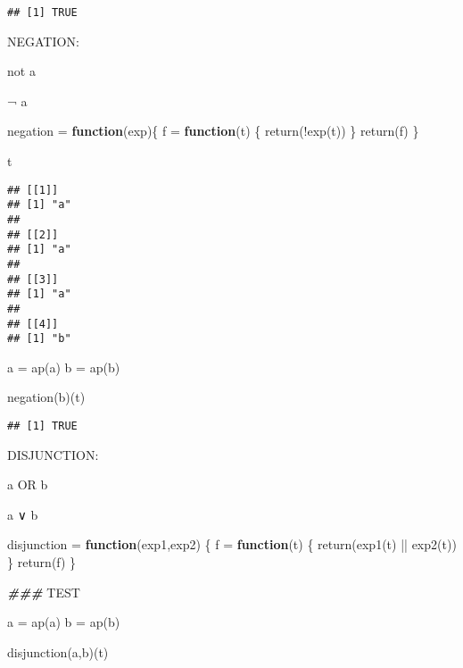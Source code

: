 \documentclass[
]{article}
\newenvironment{Shaded}{\begin{snugshade}}{\end{snugshade}}
\newcommand{\AlertTok}[1]{\textcolor[rgb]{0.94,0.16,0.16}{#1}}
\newcommand{\ControlFlowTok}[1]{\textcolor[rgb]{0.13,0.29,0.53}{\textbf{#1}}}
\newcommand{\DocumentationTok}[1]{\textcolor[rgb]{0.56,0.35,0.01}{\textbf{\textit{#1}}}}
\newcommand{\FunctionTok}[1]{\textcolor[rgb]{0.00,0.00,0.00}{#1}}
\newcommand{\NormalTok}[1]{#1}
\newcommand{\OtherTok}[1]{\textcolor[rgb]{0.56,0.35,0.01}{#1}}
\newcommand{\SpecialCharTok}[1]{\textcolor[rgb]{0.00,0.00,0.00}{#1}}
\newcommand{\StringTok}[1]{\textcolor[rgb]{0.31,0.60,0.02}{#1}}
\begin{document}
\begin{verbatim}
## [1] TRUE
\end{verbatim}

NEGATION:

not a

¬ a

\begin{Shaded}
\begin{Highlighting}[]
\NormalTok{negation }\OtherTok{=} \ControlFlowTok{function}\NormalTok{(exp)\{}
\NormalTok{  f }\OtherTok{=} \ControlFlowTok{function}\NormalTok{(t)}
\NormalTok{  \{}
    \FunctionTok{return}\NormalTok{(}\SpecialCharTok{!}\FunctionTok{exp}\NormalTok{(t))}
\NormalTok{  \}}
  \FunctionTok{return}\NormalTok{(f)}
\NormalTok{\}}

\NormalTok{t}
\end{Highlighting}
\end{Shaded}

\begin{verbatim}
## [[1]]
## [1] "a"
## 
## [[2]]
## [1] "a"
## 
## [[3]]
## [1] "a"
## 
## [[4]]
## [1] "b"
\end{verbatim}

\begin{Shaded}
\begin{Highlighting}[]
\NormalTok{a }\OtherTok{=} \FunctionTok{ap}\NormalTok{(}\StringTok{\textquotesingle{}a\textquotesingle{}}\NormalTok{)}
\NormalTok{b }\OtherTok{=} \FunctionTok{ap}\NormalTok{(}\StringTok{\textquotesingle{}b\textquotesingle{}}\NormalTok{)}

\FunctionTok{negation}\NormalTok{(b)(t)}
\end{Highlighting}
\end{Shaded}

\begin{verbatim}
## [1] TRUE
\end{verbatim}

DISJUNCTION:

a OR b

a ∨ b

\begin{Shaded}
\begin{Highlighting}[]
\NormalTok{disjunction }\OtherTok{=} \ControlFlowTok{function}\NormalTok{(exp1,exp2)}
\NormalTok{\{}
\NormalTok{  f }\OtherTok{=} \ControlFlowTok{function}\NormalTok{(t)}
\NormalTok{  \{}
    \FunctionTok{return}\NormalTok{(}\FunctionTok{exp1}\NormalTok{(t) }\SpecialCharTok{||} \FunctionTok{exp2}\NormalTok{(t))}
\NormalTok{  \}}
  \FunctionTok{return}\NormalTok{(f)}
\NormalTok{\}}

\DocumentationTok{\#\#\# }\AlertTok{TEST}\DocumentationTok{ }

\NormalTok{a }\OtherTok{=} \FunctionTok{ap}\NormalTok{(}\StringTok{\textquotesingle{}a\textquotesingle{}}\NormalTok{)}
\NormalTok{b }\OtherTok{=} \FunctionTok{ap}\NormalTok{(}\StringTok{\textquotesingle{}b\textquotesingle{}}\NormalTok{)}

\FunctionTok{disjunction}\NormalTok{(a,b)(t)}
\end{Highlighting}
\end{Shaded}
\end{document}

